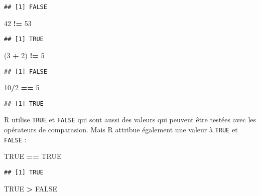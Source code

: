 \documentclass[]{book}
\newenvironment{Shaded}{\begin{snugshade}}{\end{snugshade}}
\newcommand{\DecValTok}[1]{\textcolor[rgb]{0.00,0.00,0.81}{#1}}
\newcommand{\StringTok}[1]{\textcolor[rgb]{0.31,0.60,0.02}{#1}}
\newcommand{\OtherTok}[1]{\textcolor[rgb]{0.56,0.35,0.01}{#1}}
\newcommand{\OperatorTok}[1]{\textcolor[rgb]{0.81,0.36,0.00}{\textbf{#1}}}
\newcommand{\NormalTok}[1]{#1}
\theoremstyle{definition}
\theoremstyle{definition}
\theoremstyle{definition}
\theoremstyle{remark}
\begin{document}
\begin{verbatim}
## [1] FALSE
\end{verbatim}

\begin{Shaded}
\begin{Highlighting}[]
\DecValTok{42} \OperatorTok{!=}\StringTok{ }\DecValTok{53}
\end{Highlighting}
\end{Shaded}

\begin{verbatim}
## [1] TRUE
\end{verbatim}

\begin{Shaded}
\begin{Highlighting}[]
\NormalTok{(}\DecValTok{3} \OperatorTok{+}\StringTok{ }\DecValTok{2}\NormalTok{) }\OperatorTok{!=}\StringTok{ }\DecValTok{5}
\end{Highlighting}
\end{Shaded}

\begin{verbatim}
## [1] FALSE
\end{verbatim}

\begin{Shaded}
\begin{Highlighting}[]
\DecValTok{10}\OperatorTok{/}\DecValTok{2} \OperatorTok{==}\StringTok{ }\DecValTok{5}
\end{Highlighting}
\end{Shaded}

\begin{verbatim}
## [1] TRUE
\end{verbatim}

R utilise \texttt{TRUE} et \texttt{FALSE} qui sont aussi des valeurs qui
peuvent être testées avec les opérateurs de comparasion. Mais R attribue
également une valeur à \texttt{TRUE} et \texttt{FALSE} :

\begin{Shaded}
\begin{Highlighting}[]
\OtherTok{TRUE} \OperatorTok{==}\StringTok{ }\OtherTok{TRUE}
\end{Highlighting}
\end{Shaded}

\begin{verbatim}
## [1] TRUE
\end{verbatim}

\begin{Shaded}
\begin{Highlighting}[]
\OtherTok{TRUE} \OperatorTok{>}\StringTok{ }\OtherTok{FALSE}
\end{Highlighting}
\end{Shaded}
\end{document}
